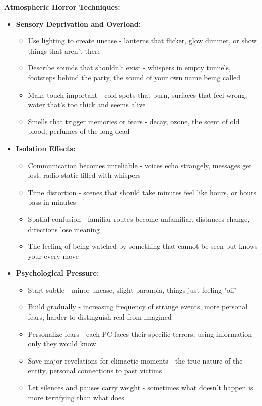\documentclass[11pt]{article}
\begin{document}
\textbf{Atmospheric Horror Techniques:}
\begin{itemize}
\item \textbf{Sensory Deprivation and Overload:}
  \begin{itemize}
  \item Use lighting to create unease - lanterns that flicker, glow dimmer, or show things that aren't there
  \item Describe sounds that shouldn't exist - whispers in empty tunnels, footsteps behind the party, the sound of your own name being called
  \item Make touch important - cold spots that burn, surfaces that feel wrong, water that's too thick and seems alive
  \item Smells that trigger memories or fears - decay, ozone, the scent of old blood, perfumes of the long-dead
  \end{itemize}
\item \textbf{Isolation Effects:}
  \begin{itemize}
  \item Communication becomes unreliable - voices echo strangely, messages get lost, radio static filled with whispers
  \item Time distortion - scenes that should take minutes feel like hours, or hours pass in minutes
  \item Spatial confusion - familiar routes become unfamiliar, distances change, directions lose meaning
  \item The feeling of being watched by something that cannot be seen but knows your every move
  \end{itemize}
\item \textbf{Psychological Pressure:}
  \begin{itemize}
  \item Start subtle - minor unease, slight paranoia, things just feeling "off"
  \item Build gradually - increasing frequency of strange events, more personal fears, harder to distinguish real from imagined
  \item Personalize fears - each PC faces their specific terrors, using information only they would know
  \item Save major revelations for climactic moments - the true nature of the entity, personal connections to past victims
  \item Let silences and pauses carry weight - sometimes what doesn't happen is more terrifying than what does
  \end{itemize}
\end{itemize}
\end{document}
